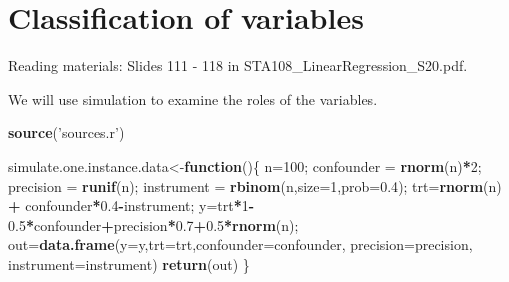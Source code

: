 \documentclass[12pt,]{book}
\newenvironment{Shaded}{\begin{snugshade}}{\end{snugshade}}
\newcommand{\KeywordTok}[1]{\textcolor[rgb]{0.13,0.29,0.53}{\textbf{#1}}}
\newcommand{\DataTypeTok}[1]{\textcolor[rgb]{0.13,0.29,0.53}{#1}}
\newcommand{\DecValTok}[1]{\textcolor[rgb]{0.00,0.00,0.81}{#1}}
\newcommand{\FloatTok}[1]{\textcolor[rgb]{0.00,0.00,0.81}{#1}}
\newcommand{\StringTok}[1]{\textcolor[rgb]{0.31,0.60,0.02}{#1}}
\newcommand{\CommentTok}[1]{\textcolor[rgb]{0.56,0.35,0.01}{\textit{#1}}}
\newcommand{\ControlFlowTok}[1]{\textcolor[rgb]{0.13,0.29,0.53}{\textbf{#1}}}
\newcommand{\OperatorTok}[1]{\textcolor[rgb]{0.81,0.36,0.00}{\textbf{#1}}}
\newcommand{\NormalTok}[1]{#1}
\begin{document}
\begin{Shaded}
\end{Shaded}

\section{Classification of variables}\label{classification-of-variables}

Reading materials: Slides 111 - 118 in
STA108\_LinearRegression\_S20.pdf.

We will use simulation to examine the roles of the variables.

\begin{Shaded}
\begin{Highlighting}[]
\KeywordTok{source}\NormalTok{(}\StringTok{'sources.r'}\NormalTok{)}

\NormalTok{simulate.one.instance.data<-}\ControlFlowTok{function}\NormalTok{()\{}
\NormalTok{n=}\DecValTok{100}\NormalTok{;}
\NormalTok{confounder =}\StringTok{ }\KeywordTok{rnorm}\NormalTok{(n)}\OperatorTok{*}\DecValTok{2}\NormalTok{;}
\NormalTok{precision =}\StringTok{ }\KeywordTok{runif}\NormalTok{(n);}
\NormalTok{instrument =}\StringTok{ }\KeywordTok{rbinom}\NormalTok{(n,}\DataTypeTok{size=}\DecValTok{1}\NormalTok{,}\DataTypeTok{prob=}\FloatTok{0.4}\NormalTok{);}
\NormalTok{trt=}\KeywordTok{rnorm}\NormalTok{(n) }\OperatorTok{+}\StringTok{ }\NormalTok{confounder}\OperatorTok{*}\FloatTok{0.4}\OperatorTok{-}\NormalTok{instrument;}
\NormalTok{y=trt}\OperatorTok{*}\DecValTok{1}\OperatorTok{-}\FloatTok{0.5}\OperatorTok{*}\NormalTok{confounder}\OperatorTok{+}\NormalTok{precision}\OperatorTok{*}\FloatTok{0.7}\OperatorTok{+}\FloatTok{0.5}\OperatorTok{*}\KeywordTok{rnorm}\NormalTok{(n);}
\NormalTok{out=}\KeywordTok{data.frame}\NormalTok{(}\DataTypeTok{y=}\NormalTok{y,}\DataTypeTok{trt=}\NormalTok{trt,}\DataTypeTok{confounder=}\NormalTok{confounder, }\DataTypeTok{precision=}\NormalTok{precision, }\DataTypeTok{instrument=}\NormalTok{instrument)}
\KeywordTok{return}\NormalTok{(out)}
\NormalTok{\}}
\end{Highlighting}
\end{Shaded}
\end{document}
